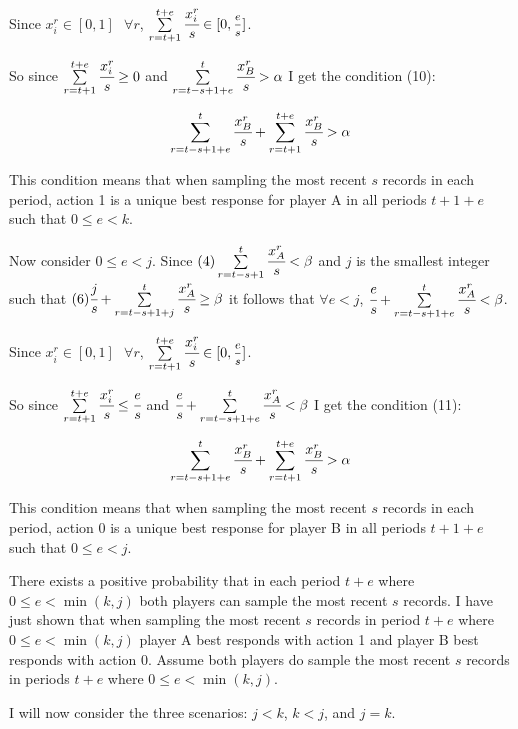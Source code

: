 \documentclass{article}
\begin{document}
Since $x_i^r \in [0,1] \hspace{8pt} \forall r$, $\sum\limits_{r=t+1}^{t+e} \cfrac{x^r_i}{s} \in [0,\mfrac{e}{s}]$.

So since $\sum\limits_{r=t+1}^{t+e} \cfrac{x^r_i}{s} \geq 0$ and $\sum\limits_{r=t-s+1+e}^{t} \cfrac{x^r_B}{s} > \alpha$ I get the condition (10):

$$\sum\limits_{r=t-s+1+e}^{t}\cfrac{x^r_B}{s}+\sum\limits_{r=t+1}^{t+e} \cfrac{x^r_B}{s} > \alpha$$

This condition means that when sampling the most recent $s$ records in each period, action 1 is a unique best response for player A in all periods $t+1+e$ such that $0 \leq e<k$.

\vskip18pt

Now consider $0 \leq e<j$. Since $(4) \sum\limits_{r=t-s+1}^{t} \cfrac{x^r_A}{s} < \beta$ and $j$ is the smallest integer such that $(6) \cfrac{j}{s}+\sum\limits_{r=t-s+1+j}^{t} \cfrac{x^r_A}{s} \geq \beta$ it follows that $\forall e<j$, $\cfrac{e}{s}+\sum\limits_{r=t-s+1+e}^{t} \cfrac{x^r_A}{s} < \beta$.

Since $x_i^r \in [0,1] \hspace{8pt} \forall r$, $\sum\limits_{r=t+1}^{t+e} \cfrac{x^r_i}{s} \in [0,\mfrac{e}{s}]$.

So since $\sum\limits_{r=t+1}^{t+e} \cfrac{x^r_i}{s} \leq \cfrac{e}{s}$ and $\cfrac{e}{s}+\sum\limits_{r=t-s+1+e}^{t} \cfrac{x^r_A}{s} < \beta$ I get the condition (11):

$$\sum\limits_{r=t-s+1+e}^{t}\cfrac{x^r_B}{s}+\sum\limits_{r=t+1}^{t+e} \cfrac{x^r_B}{s} > \alpha$$

This condition means that when sampling the most recent $s$ records in each period, action 0 is a unique best response for player B in all periods $t+1+e$ such that $0 \leq e<j$.

\vskip12pt

There exists a positive probability that in each period $t+e$ where $0 \leq e<\min (k,j)$ both players can sample the most recent $s$ records. I have just shown that when sampling the most recent $s$ records in period $t+e$ where $0 \leq e<\min (k,j)$ player A best responds with action 1 and player B best responds with action 0. Assume both players do sample the most recent $s$ records in periods $t+e$ where $0 \leq e<\min (k,j)$.

\vskip12pt

I will now consider the three scenarios: $j<k$, $k<j$, and $j=k$.
\end{document}
